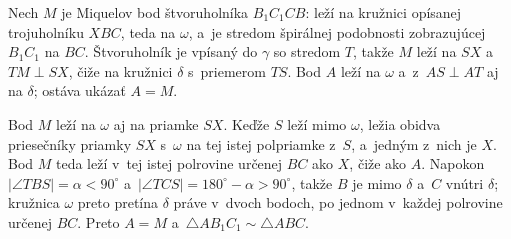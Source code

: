 {    Nech $M$ je Miquelov bod štvoruholníka $B_1C_1CB$: leží na kružnici opísanej trojuholníku $XBC$, teda na $\omega$, a~je stredom špirálnej podobnosti zobrazujúcej $B_1C_1$ na $BC$. Štvoruholník je vpísaný do $\gamma$ so stredom $T$, takže $M$ leží na $SX$ a~$TM \perp SX$, čiže na kružnici $\delta$ s~priemerom $TS$. Bod $A$ leží na $\omega$ a~z~$AS \perp AT$ aj na $\delta$; ostáva ukázať $A=M$.


    Bod $M$ leží na $\omega$ aj na priamke $SX$. Keďže $S$ leží mimo $\omega$, ležia obidva priesečníky priamky $SX$ s~$\omega$ na tej istej polpriamke z~$S$, a~jedným z~nich je $X$. Bod $M$ teda leží v~tej istej polrovine určenej $BC$ ako $X$, čiže ako $A$. Napokon $|\angle TBS|=\alpha<90^\circ$ a~$|\angle TCS|=180^\circ-\alpha>90^\circ$, takže $B$ je mimo $\delta$ a~$C$ vnútri $\delta$; kružnica $\omega$ preto pretína $\delta$ práve v~dvoch bodoch, po jednom v~každej polrovine určenej $BC$. Preto $A=M$ a~$\triangle AB_1C_1 \sim \triangle ABC$.
}

